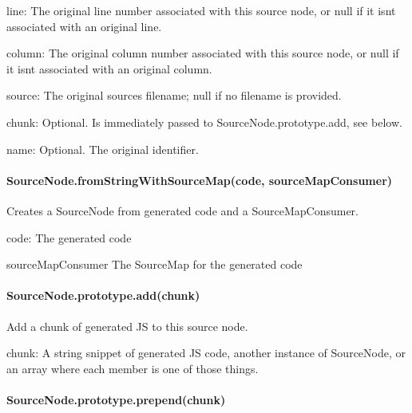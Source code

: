 \begin{DoxyItemize}
\item {\ttfamily line}\+: The original line number associated with this source node, or null if it isn\textquotesingle{}t associated with an original line.
\item {\ttfamily column}\+: The original column number associated with this source node, or null if it isn\textquotesingle{}t associated with an original column.
\item {\ttfamily source}\+: The original source\textquotesingle{}s filename; null if no filename is provided.
\item {\ttfamily chunk}\+: Optional. Is immediately passed to {\ttfamily Source\+Node.\+prototype.\+add}, see below.
\item {\ttfamily name}\+: Optional. The original identifier.
\end{DoxyItemize}

\paragraph*{Source\+Node.\+from\+String\+With\+Source\+Map(code, source\+Map\+Consumer)}

Creates a Source\+Node from generated code and a Source\+Map\+Consumer.


\begin{DoxyItemize}
\item {\ttfamily code}\+: The generated code
\item {\ttfamily source\+Map\+Consumer} The Source\+Map for the generated code
\end{DoxyItemize}

\paragraph*{Source\+Node.\+prototype.\+add(chunk)}

Add a chunk of generated J\+S to this source node.


\begin{DoxyItemize}
\item {\ttfamily chunk}\+: A string snippet of generated J\+S code, another instance of {\ttfamily Source\+Node}, or an array where each member is one of those things.
\end{DoxyItemize}

\paragraph*{Source\+Node.\+prototype.\+prepend(chunk)}

